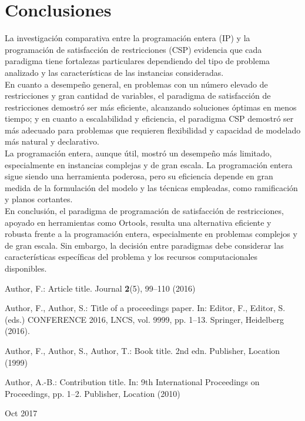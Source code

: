 \documentclass[12pt]{report}
\begin{document}
\chapter{Conclusiones}

La investigación comparativa entre la programación entera (IP) y la programación de satisfacción de restricciones (CSP) evidencia que cada paradigma tiene fortalezas particulares dependiendo del tipo de problema analizado y las características de las instancias consideradas. \\

En cuanto a desempeño general, en problemas con un número elevado de restricciones y gran cantidad de variables, el paradigma de satisfacción de restricciones demostró ser más eficiente, alcanzando soluciones óptimas en menos tiempo; y en cuanto a escalabilidad y eficiencia, el paradigma CSP demostró ser más adecuado para problemas que requieren flexibilidad y capacidad de modelado más natural y declarativo. \\

La programación entera, aunque útil, mostró un desempeño más limitado, especialmente en instancias complejas y de gran escala. La programación entera sigue siendo una herramienta poderosa, pero su eficiencia depende en gran medida de la formulación del modelo y las técnicas empleadas, como ramificación y planos cortantes.\\

En conclusión, el paradigma de programación de satisfacción de restricciones, apoyado en herramientas como Ortools, resulta una alternativa eficiente y robusta frente a la programación entera, especialmente en problemas complejos y de gran escala. Sin embargo, la decisión entre paradigmas debe considerar las características específicas del problema y los recursos computacionales disponibles.

% 
% 

\begin{thebibliography}{8}
Author, F.: Article title. Journal \textbf{2}(5), 99--110 (2016)

Author, F., Author, S.: Title of a proceedings paper. In: Editor,
F., Editor, S. (eds.) CONFERENCE 2016, LNCS, vol. 9999, pp. 1--13.
Springer, Heidelberg (2016).

Author, F., Author, S., Author, T.: Book title. 2nd edn. Publisher,
Location (1999)

Author, A.-B.: Contribution title. In: 9th International Proceedings
on Proceedings, pp. 1--2. Publisher, Location (2010)

Oct 2017
\end{thebibliography}
\end{document}
